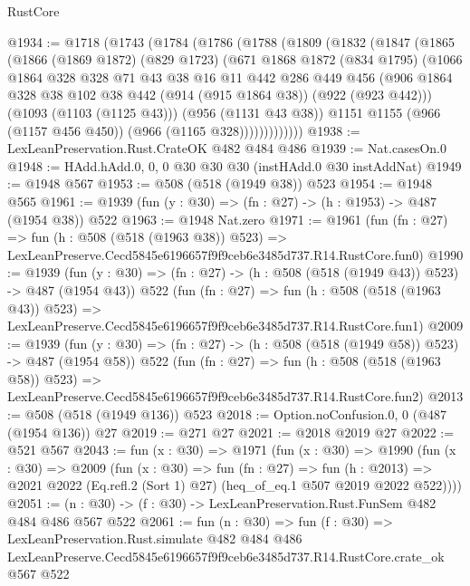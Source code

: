 \begin{lexlean}{RustCore}
\begin{coremodule}
@1934 := @1718
    (@1743
      (@1784
        (@1786
          (@1788
            (@1809
              (@1832
                (@1847
                  (@1865
                    (@1866
                      (@1869 @1872)
                      (@829 @1723)
                      (@671
                        @1868
                        @1872
                        (@834 @1795)
                        (@1066
                          @1864
                          @328
                          @328
                          @71
                          @43
                          @38
                          @16
                          @11
                          @442
                          @286
                          @449
                          @456
                          (@906
                            @1864
                            @328
                            @38
                            @102
                            @38
                            @442
                            (@914 (@915 @1864 @38))
                            (@922 (@923 @442)))
                          (@1093 (@1103 (@1125 @43)))
                          (@956 (@1131 @43 @38))
                          @1151
                          @1155
                          (@966 (@1157 @456 @450))
                          (@966 (@1165 @328)))))))))))))
@1938 := LexLeanPreservation.Rust.CrateOK @482 @484 @486
@1939 := Nat.casesOn.{0}
@1948 := HAdd.hAdd.{0, 0, 0} @30 @30 @30 (instHAdd.{0} @30 instAddNat)
@1949 := @1948 @567
@1953 := @508 (@518 (@1949 @38)) @523
@1954 := @1948 @565
@1961 := @1939 (fun (y : @30) => (fn : @27) -> (h : @1953) -> @487 (@1954 @38)) @522
@1963 := @1948 Nat.zero
@1971 := @1961
    (fun (fn : @27) =>
    fun (h : @508 (@518 (@1963 @38)) @523) =>
    LexLeanPreserve.Cecd5845e6196657f9f9ceb6e3485d737.R14.RustCore.fun0)
@1990 := @1939
    (fun (y : @30) => (fn : @27) -> (h : @508 (@518 (@1949 @43)) @523) -> @487 (@1954 @43))
    @522
    (fun (fn : @27) =>
    fun (h : @508 (@518 (@1963 @43)) @523) =>
    LexLeanPreserve.Cecd5845e6196657f9f9ceb6e3485d737.R14.RustCore.fun1)
@2009 := @1939
    (fun (y : @30) => (fn : @27) -> (h : @508 (@518 (@1949 @58)) @523) -> @487 (@1954 @58))
    @522
    (fun (fn : @27) =>
    fun (h : @508 (@518 (@1963 @58)) @523) =>
    LexLeanPreserve.Cecd5845e6196657f9f9ceb6e3485d737.R14.RustCore.fun2)
@2013 := @508 (@518 (@1949 @136)) @523
@2018 := Option.noConfusion.{0, 0} (@487 (@1954 @136)) @27
@2019 := @271 @27
@2021 := @2018 @2019 @27
@2022 := @521 @567
@2043 := fun (x : @30) =>
  @1971
    (fun (x : @30) =>
    @1990
      (fun (x : @30) =>
      @2009
        (fun (x : @30) =>
        fun (fn : @27) =>
        fun (h : @2013) =>
        @2021 @2022 (Eq.refl.{2} (Sort 1) @27) (heq_of_eq.{1} @507 @2019 @2022 @522))))
@2051 := (n : @30) -> (f : @30) -> LexLeanPreservation.Rust.FunSem @482 @484 @486 @567 @522
@2061 := fun (n : @30) =>
  fun (f : @30) =>
  LexLeanPreservation.Rust.simulate
    @482
    @484
    @486
    LexLeanPreserve.Cecd5845e6196657f9f9ceb6e3485d737.R14.RustCore.crate_ok
    @567
    @522
\end{coremodule}
\end{lexlean}
